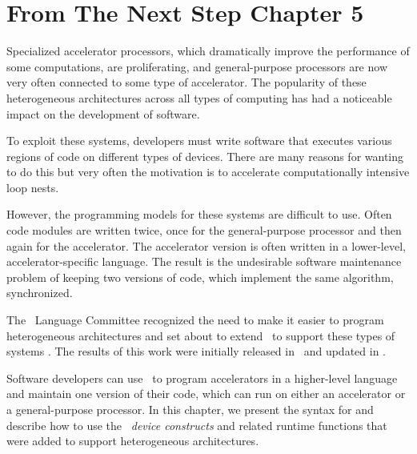 \section{From The Next Step Chapter 5}

Specialized accelerator processors, which dramatically improve the performance
of some computations, are proliferating, and general-purpose processors are
now very often connected to some type of accelerator.  
The popularity of these heterogeneous architectures across all types of
computing has had a noticeable impact on the development of software.  

To exploit these systems, developers must write software that executes various
regions of code on different types of devices.  There are many reasons for
wanting to do this but very often the motivation is to accelerate
computationally intensive loop nests.  

However, the programming models for these systems are difficult to use.
Often code modules are written twice, once for the general-purpose
processor and then again for the accelerator.  The accelerator version is often
written in a lower-level, accelerator-specific language.  The result is the
undesirable software maintenance problem of keeping two versions of code, which
implement the same algorithm, synchronized.

The \OMP\ Language Committee recognized the need to make it easier to program
heterogeneous architectures and set about to extend \OMP\ to support these types
of systems \cite{Beyer2011}.  The results of this work were initially released
in \OMPfourzero\ and updated in \OMPfourfive.

Software developers can use \OMP\ to program accelerators in a higher-level
language and maintain one version of their code, which can run on either an
accelerator or a general-purpose processor.  In this chapter, we present the
syntax for and describe how to use the \OMP\ \emph{device constructs} and
related runtime functions that were added to support heterogeneous
architectures. 



